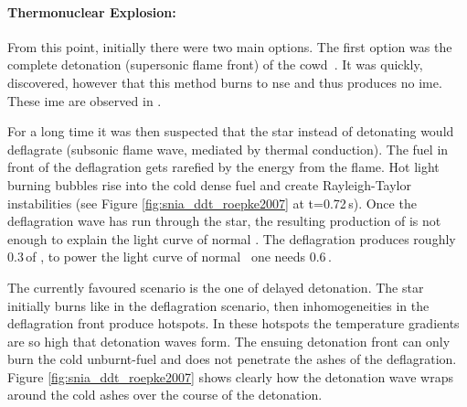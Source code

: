 \paragraph{Thermonuclear Explosion:} From this point, initially there were two main options. The first option was the complete detonation (supersonic flame front) of the \gls{cowd}\ \citep{1969Ap&SS...5..180A}. It was quickly, discovered, however that this method burns to \gls{nse} and thus produces no \gls{ime}. These \gls{ime} are observed in \snia.

For a long time it was then suspected that the star instead of detonating would deflagrate (subsonic flame wave, mediated by thermal conduction). The fuel in front of the deflagration gets rarefied by the energy from the flame. Hot light burning bubbles rise into the cold dense fuel and create Rayleigh-Taylor instabilities (see Figure \ref{fig:snia_ddt_roepke2007} at t=0.72\,s). 
Once the deflagration wave has run through the star, the resulting production of \Ni[56] is not enough to explain the light curve of normal \snia. The deflagration produces roughly 0.3\,\msun of \Ni[56], to power the light curve of normal \sneia\ one needs 0.6\,\msun \citep{2007Sci...315..825M}.

The currently favoured scenario is the one of delayed detonation. The star initially burns like in the deflagration scenario, then inhomogeneities in the deflagration front produce hotspots. In these hotspots the temperature gradients are so high that detonation waves form. The ensuing detonation front can only burn the cold unburnt-fuel and does not penetrate the ashes of the deflagration. Figure \ref{fig:snia_ddt_roepke2007} shows clearly how the detonation wave wraps around the cold ashes over the course of the detonation.


